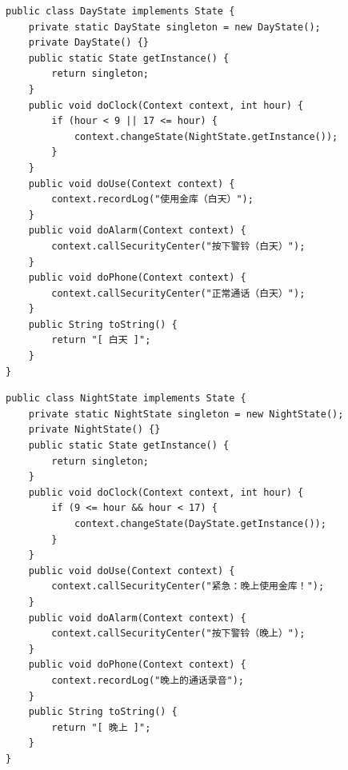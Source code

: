 \begin{lstlisting}
public class DayState implements State {
	private static DayState singleton = new DayState();
	private DayState() {}
	public static State getInstance() {
		return singleton;
	}
	public void doClock(Context context, int hour) {
		if (hour < 9 || 17 <= hour) {
			context.changeState(NightState.getInstance());
		}
	}
	public void doUse(Context context) {
		context.recordLog("使用金库（白天）");
	}
	public void doAlarm(Context context) {
		context.callSecurityCenter("按下警铃（白天）");
	}
	public void doPhone(Context context) {
		context.callSecurityCenter("正常通话（白天）");
	}
	public String toString() {
		return "[ 白天 ]";
	}
}
\end{lstlisting}
\begin{lstlisting}
public class NightState implements State {
	private static NightState singleton = new NightState();
	private NightState() {}
	public static State getInstance() {
		return singleton;
	}
	public void doClock(Context context, int hour) {
		if (9 <= hour && hour < 17) {
			context.changeState(DayState.getInstance());
		}
	}
	public void doUse(Context context) {
		context.callSecurityCenter("紧急：晚上使用金库！");
	}
	public void doAlarm(Context context) {
		context.callSecurityCenter("按下警铃（晚上）");
	}
	public void doPhone(Context context) {
		context.recordLog("晚上的通话录音");
	}
	public String toString() {
		return "[ 晚上 ]";
	}
}
\end{lstlisting}
